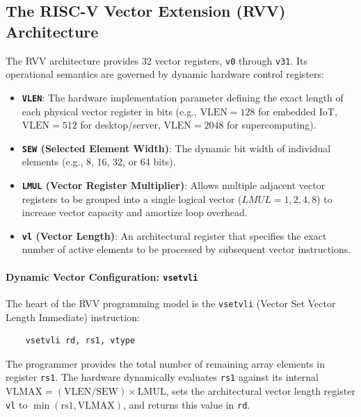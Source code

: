 \subsection{The RISC-V Vector Extension (RVV) Architecture}
The RVV architecture provides 32 vector registers, \texttt{v0} through \texttt{v31}. Its operational semantics are governed by dynamic hardware control registers:
\begin{itemize}
    \item \textbf{\texttt{VLEN}}: The hardware implementation parameter defining the exact length of each physical vector register in bits (e.g., $\text{VLEN} = 128$ for embedded IoT, $\text{VLEN} = 512$ for desktop/server, $\text{VLEN} = 2048$ for supercomputing).
    \item \textbf{\texttt{SEW} (Selected Element Width)}: The dynamic bit width of individual elements (e.g., 8, 16, 32, or 64 bits).
    \item \textbf{\texttt{LMUL} (Vector Register Multiplier)}: Allows multiple adjacent vector registers to be grouped into a single logical vector ($LMUL = 1, 2, 4, 8$) to increase vector capacity and amortize loop overhead.
    \item \textbf{\texttt{vl} (Vector Length)}: An architectural register that specifies the exact number of active elements to be processed by subsequent vector instructions.
\end{itemize}

\paragraph{Dynamic Vector Configuration: \texttt{vsetvli}}
The heart of the RVV programming model is the \texttt{vsetvli} (Vector Set Vector Length Immediate) instruction:
\begin{verbatim}
    vsetvli rd, rs1, vtype
\end{verbatim}
The programmer provides the total number of remaining array elements in register \texttt{rs1}. The hardware dynamically evaluates \texttt{rs1} against its internal $\text{VLMAX} = (\text{VLEN} / \text{SEW}) \times \text{LMUL}$, sets the architectural vector length register \texttt{vl} to $\min(\text{rs1}, \text{VLMAX})$, and returns this value in \texttt{rd}.

